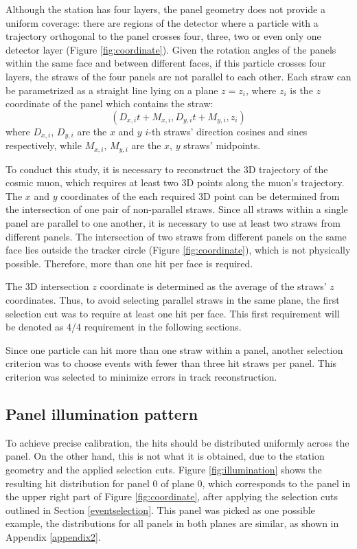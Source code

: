 Although the station has four layers, 
the panel geometry does not provide a uniform
coverage: there are regions of the 
detector where a particle with a trajectory orthogonal
to the panel crosses four, three, two or even only one 
detector layer (Figure \ref{fig:coordinate}). Given the
rotation angles of the panels within the same 
face and between different faces, if this particle
crosses four layers, the straws of the four 
panels are not parallel to each other.
Each straw can be parametrized as a straight line 
lying on a plane $z = z_i$, where $z_i$ is the $z$ 
coordinate of the panel which contains the straw:
\begin{equation}\label{equaretta}
    (D_{x,i}t+M_{x,i},D_{y,i}t+M_{y,i},z_i)
\end{equation}
where $D_{x,i}$, $D_{y,i}$ are the $x$ and $y$ 
$i$-th straws' direction cosines and sines respectively, 
while $M_{x,i}$, $M_{y,i}$ are the $x$, $y$ straws' midpoints.

To conduct this study, it is necessary to 
reconstruct the 3D trajectory of the cosmic muon, 
which requires at least two 3D points along the muon's 
trajectory. The $x$ and $y$ coordinates of 
the each required 3D point can be determined 
from the intersection of one pair of non-parallel 
straws. Since all straws within a single panel are parallel to 
one another, it is necessary to use at least two straws from 
different panels. The intersection of two straws from 
different panels on the same face lies outside the tracker circle 
(Figure \ref{fig:coordinate}), which is not physically possible. 
Therefore, more than one hit per face is required.

The 3D intersection $z$ 
coordinate is determined as the average of the 
straws' $z$ coordinates. Thus, to avoid selecting 
parallel straws in the same plane, 
the first selection cut 
was to require at least one hit per face. 
This first requirement will be denoted as 
4/4 requirement in the following sections.

Since one particle can hit more than one straw within a panel, 
another selection criterion was to choose events 
with fewer than three hit straws per panel. 
This criterion was selected to minimize errors 
in track reconstruction.
\subsection{Panel illumination pattern}
To achieve precise calibration, the hits should 
be distributed uniformly across the panel.
On the other hand, this is 
not what it is obtained, due to the station geometry
and the applied selection cuts. 
Figure \ref{fig:illumination} shows the 
resulting hit distribution for panel 0 of
plane 0, which corresponds 
to the panel in 
the upper right part of Figure \ref{fig:coordinate}, 
after applying the selection cuts 
outlined in Section 
\ref{eventselection}. 
This panel was picked as one possible 
example, the 
distributions for all panels in 
both planes are similar, as
shown in Appendix \ref{appendix2}.

